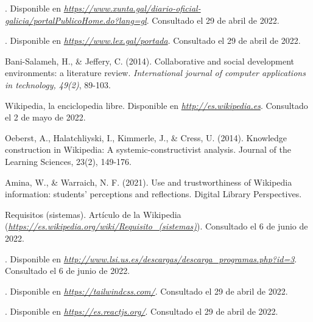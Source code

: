 

\begin{thebibliography}{99}

. Disponible en {\it \url{https://www.xunta.gal/diario-oficial-galicia/portalPublicoHome.do?lang=gl}}. Consultado el 29 de abril de 2022.

. Disponible en {\it \url{https://www.lex.gal/portada}}. Consultado el 29 de abril de 2022.

 Bani-Salameh, H., \& Jeffery, C. (2014). Collaborative and social development environments: a literature review. {\it International journal of computer applications in technology, 49(2)}, 89-103.

 Wikipedia, la enciclopedia libre. Disponible en {\it \url{http://es.wikipedia.es}}. Consultado el 2 de mayo de 2022.

 Oeberst, A., Halatchliyski, I., Kimmerle, J., \& Cress, U. (2014). Knowledge construction in Wikipedia: A systemic-constructivist analysis. Journal of the Learning Sciences, 23(2), 149-176.

 Amina, W., \& Warraich, N. F. (2021). Use and trustworthiness of Wikipedia information: students’ perceptions and reflections. Digital Library Perspectives.

 Requisitos (sistemas). Artículo de la Wikipedia ({\it \url{https://es.wikipedia.org/wiki/Requisito_(sistemas)}}). Consultado el 6 de junio de 2022.

. Disponible en {\it \url{http://www.lsi.us.es/descargas/descarga_programas.php?id=3}}. Consultado el 6 de junio de 2022.


. Disponible en {\it \url{https://tailwindcss.com/}}. Consultado el 29 de abril de 2022.

. Disponible en {\it \url{https://es.reactjs.org/}}. Consultado el 29 de abril de 2022.


\end{thebibliography}
